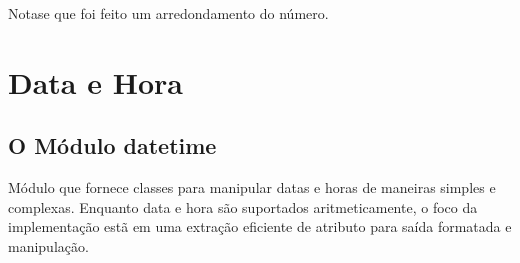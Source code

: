 \documentclass[letterpaper,10pt,brazil]{sphinxmanual}
\begin{document}
Nota\sphinxhyphen{}se que foi feito um arredondamento do número.


\chapter{Data e Hora}
\label{\detokenize{content/date_time:data-e-hora}}\label{\detokenize{content/date_time::doc}}

\section{O Módulo datetime}
\label{\detokenize{content/date_time:o-modulo-datetime}}
Módulo que fornece classes para manipular datas e horas de maneiras simples e
complexas.
Enquanto data e hora são suportados aritmeticamente, o foco da implementação
estã em uma extração eficiente de atributo para saída formatada e manipulação.

\begin{sphinxVerbatim}[commandchars=\\\{\}]
   
   
   
\end{sphinxVerbatim}

\begin{sphinxVerbatim}[commandchars=\\\{\}]
  
\end{sphinxVerbatim}

\begin{sphinxVerbatim}[commandchars=\\\{\}]
\end{sphinxVerbatim}

\begin{sphinxVerbatim}[commandchars=\\\{\}]
\end{sphinxVerbatim}

\begin{sphinxVerbatim}[commandchars=\\\{\}]
\end{sphinxVerbatim}
\end{document}
